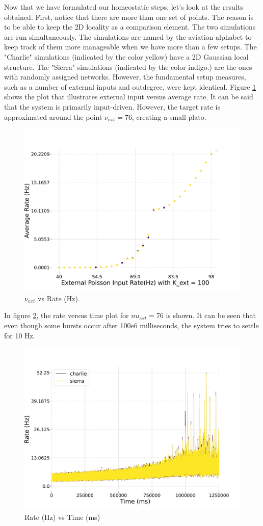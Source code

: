 \documentclass[a4paper,12pt]{article}
\begin{document}
Now that we have formulated our homeostatic steps, let's look at the results obtained. First, notice that there are more than one set of points. The reason is to be able to keep the 2D locality as a comparison element. The two simulations are run simultaneously. The simulations are named by the aviation alphabet to keep track of them more manageable when we have more than a few setups. The "Charlie" simulations (indicated by the color yellow) have a 2D Gaussian local structure. The "Sierra" simulations (indicated by the color indigo.) are the ones with randomly assigned networks. However, the fundamental setup measures, such as a number of external inputs and outdegree, were kept identical. Figure \ref{charlie} shows the plot that illustrates external input versus average rate. It can be said that the system is primarily input-driven. However, the target rate is approximated around the point $\nu_{ext} = 76$, creating a small plato. 
\begin{figure}[H] 
    \centering
    \includegraphics[width=0.8\linewidth]{nuext_vs_activity_charlie.pdf}
    \caption{$\nu_{ext}$ vs Rate (Hz).}
    \label{charlie}
\end{figure}
In figure \ref{charlie76ratevstime}, the rate versus time plot for $nu_{ext} = 76$ is shown. It can be seen that even though some bursts occur after 100e6 milliseconds, the system tries to settle for 10 Hz.
\begin{figure}[H] 
    \centering
    \includegraphics[width=0.8\linewidth]{nu_ext_76rate_over_time_homeostasis.pdf}
    \caption{Rate (Hz) vs Time (ms)}
    \label{charlie76ratevstime}
\end{figure}
\end{document}
